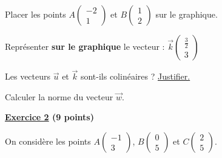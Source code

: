\documentclass[12pt,a4paper]{exam}
\newcommand*{\Coord}[2]{%
  \ensuremath{
    \begin{pmatrix} 
      #1\\[5pt]
      #2 
    \end{pmatrix}}}
\begin{document}
\vspace{5pt}
\begin{questions}

\question[0,5] Placer les points $A\Coord{-2}{1}$ et $B\Coord{1}{2}$ sur le graphique.

\vspace{10pt}

\question
{}

\question[1] Représenter \textbf{sur le graphique} le vecteur : $\overrightarrow{k}\Coord{\frac{3}{2}}{3}$

\question[2] Les vecteurs $\overrightarrow{u}$ et $\overrightarrow{k}$ sont-ils colinéaires ? 
\underline{Justifier.}

\question[1] Calculer la norme du vecteur $\overrightarrow{w}$.



\end{questions}

\vspace{1cm}


\textbf{\underline{Exercice 2} (9 points)}

On considère les points $A\Coord{-1}{3}$, $B\Coord{0}{5}$ et $C\Coord{2}{5}$.
\end{document}
